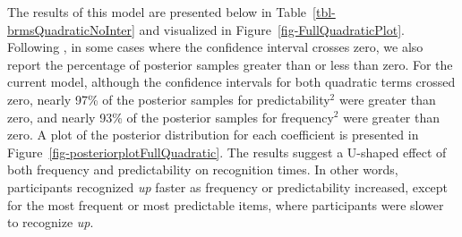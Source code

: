 \documentclass[
  authoryear,
  preprint,
  1p,
  onecolumn]{elsarticle}
\begin{document}
The results of this model are presented below in
Table~\ref{tbl-brmsQuadraticNoInter} and visualized in
Figure~\ref{fig-FullQuadraticPlot}. Following
\citet{houghtonTaskdependentConsequencesDisfluency2023}, in some cases
where the confidence interval crosses zero, we also report the
percentage of posterior samples greater than or less than zero. For the
current model, although the confidence intervals for both quadratic
terms crossed zero, nearly 97\% of the posterior samples for
predictability\(^2\) were greater than zero, and nearly 93\% of the
posterior samples for frequency\(^2\) were greater than zero. A plot of
the posterior distribution for each coefficient is presented in
Figure~\ref{fig-posteriorplotFullQuadratic}. The results suggest a
U-shaped effect of both frequency and predictability on recognition
times. In other words, participants recognized \emph{up} faster as
frequency or predictability increased, except for the most frequent or
most predictable items, where participants were slower to recognize
\emph{up}.

\begin{table}

\caption{\label{tbl-brmsQuadraticNoInter}Model results for the Bayesian
quadratic regression model containing fixed-effects for frequency,
predictability, and their quadratics.}


\end{table}%
\end{document}

